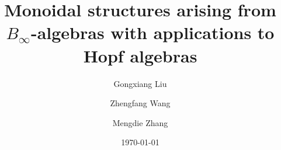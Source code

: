 \documentclass[a4paper, 11pt]{amsart}
\theoremstyle{definition}
\theoremstyle{remark}
\numberwithin{equation}{section}
\begin{document}
\title[Tensor products from $B_\infty$-algebras with applications to Hopf algebras]{Monoidal structures arising from $B_\infty$-algebras with applications to Hopf algebras}

\author{Gongxiang Liu}
	\address{School of Mathematics, Nanjing University, Nanjing 210093, Jiangsu, China}
\author{Zhengfang Wang}
	\address{School of Mathematics, Nanjing University, Nanjing 210093, Jiangsu, China}
\author{Mengdie Zhang}
	\address{School of Mathematics, Nanjing University, Nanjing 210093, Jiangsu, China}






\date{\today}
\end{document}
